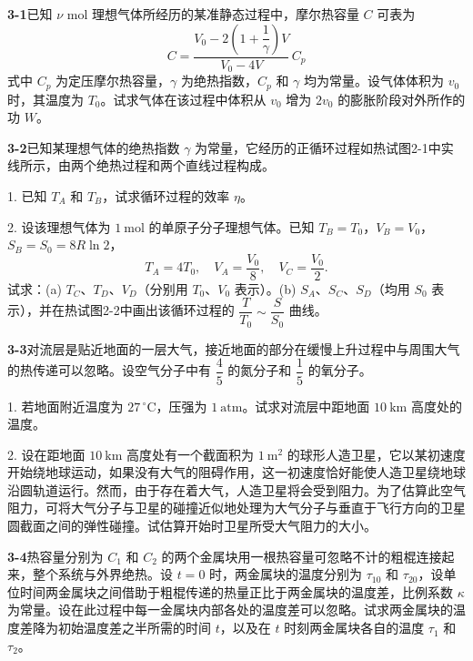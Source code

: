 \newpage
\textbf{3-1}\quad 已知 $\nu$ mol 理想气体所经历的某准静态过程中，摩尔热容量 $C$ 可表为
$$
C = \frac{V_{0} - 2\!\left(1 + \dfrac{1}{\gamma}\right)V}{V_{0} - 4V}\,C_{p}
$$
式中 $C_{p}$ 为定压摩尔热容量，$\gamma$ 为绝热指数，$C_{p}$ 和 $\gamma$ 均为常量。设气体体积为 $v_{0}$ 时，其温度为 $T_{0}$。试求气体在该过程中体积从 $v_{0}$ 增为 $2v_{0}$ 的膨胀阶段对外所作的功 $W$。
\vfill

\textbf{3-2}\quad 已知某理想气体的绝热指数 $\gamma$ 为常量，它经历的正循环过程如热试图2-1中实线所示，由两个绝热过程和两个直线过程构成。


1. 已知 $T_{A}$ 和 $T_{B}$，试求循环过程的效率 $\eta$。

2. 设该理想气体为 $1\ \mathrm{mol}$ 的单原子分子理想气体。已知 $T_{B} = T_{0}$，$V_{B} = V_{0}$，$S_{B} = S_{0} = 8R\ln 2$，
$$
T_{A} = 4T_{0},\quad V_{A} = \frac{V_{0}}{8},\quad V_{C} = \frac{V_{0}}{2}.
$$
试求：(a) $T_{C}$、$T_{D}$、$V_{D}$（分别用 $T_{0}$、$V_{0}$ 表示）。(b) $S_{A}$、$S_{C}$、$S_{D}$（均用 $S_{0}$ 表示），并在热试图2-2中画出该循环过程的 $\dfrac{T}{T_{0}} \sim \dfrac{S}{S_{0}}$ 曲线。
\vfill

\newpage
\textbf{3-3}\quad 对流层是贴近地面的一层大气，接近地面的部分在缓慢上升过程中与周围大气的热传递可以忽略。设空气分子中有 $\dfrac{4}{5}$ 的氮分子和 $\dfrac{1}{5}$ 的氧分子。

1. 若地面附近温度为 $27\,^{\circ}\mathrm{C}$，压强为 $1\ \mathrm{atm}$。试求对流层中距地面 $10\ \mathrm{km}$ 高度处的温度。

2. 设在距地面 $10\ \mathrm{km}$ 高度处有一个截面积为 $1\ \mathrm{m}^{2}$ 的球形人造卫星，它以某初速度开始绕地球运动，如果没有大气的阻碍作用，这一初速度恰好能使人造卫星绕地球沿圆轨道运行。然而，由于存在着大气，人造卫星将会受到阻力。为了估算此空气阻力，可将大气分子与卫星的碰撞近似地处理为大气分子与垂直于飞行方向的卫星圆截面之间的弹性碰撞。试估算开始时卫星所受大气阻力的大小。
\vfill

\textbf{3-4}\quad 热容量分别为 $C_{1}$ 和 $C_{2}$ 的两个金属块用一根热容量可忽略不计的粗棍连接起来，整个系统与外界绝热。设 $t = 0$ 时，两金属块的温度分别为 $\tau_{10}$ 和 $\tau_{20}$，设单位时间两金属块之间借助于粗棍传递的热量正比于两金属块的温度差，比例系数 $\kappa$ 为常量。设在此过程中每一金属块内部各处的温度差可以忽略。试求两金属块的温度差降为初始温度差之半所需的时间 $t$，以及在 $t$ 时刻两金属块各自的温度 $\tau_{1}$ 和 $\tau_{2}$。
\vfill

